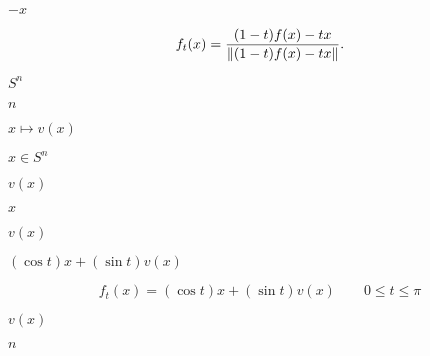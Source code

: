 \documentclass[10pt]{book}
\begin{document}
\begin{mdSnippets}
\begin{mdInlineSnippet}[d25c186e3f3096a9ff4a918f7b3141d4]
$-x$\end{mdInlineSnippet}%
\begin{mdDisplaySnippet}[734b60104e47487acc009a7e79621da6]%
\[%
f_t(x) = \frac{(1-t)f(x) - tx}{\norm{(1-t)f(x) - tx}}.
\]%
\end{mdDisplaySnippet}%
\begin{mdInlineSnippet}[f74115260830faf5178589e98c061a4e]%
$S^n$\end{mdInlineSnippet}%
\begin{mdInlineSnippet}[7b8b965ad4bca0e41ab51de7b31363a1]%
$n$\end{mdInlineSnippet}%
\begin{mdInlineSnippet}[70148f95c08937695dfa9ad2d002c2dc]%
$x \mapsto v(x)$\end{mdInlineSnippet}%
\begin{mdInlineSnippet}%
$x \in S^n$\end{mdInlineSnippet}%
\begin{mdInlineSnippet}[6668cae114cc8d4dc991ac6152f99da5]%
$v(x)$\end{mdInlineSnippet}%
\begin{mdInlineSnippet}[9dd4e461268c8034f5c8564e155c67a6]%
$x$\end{mdInlineSnippet}%
\begin{mdInlineSnippet}[6668cae114cc8d4dc991ac6152f99da5]%
$v(x)$\end{mdInlineSnippet}%
\begin{mdInlineSnippet}%
$(\cos t)x + (\sin t)v(x)$\end{mdInlineSnippet}%
\begin{mdDisplaySnippet}[d605d2e14b5f8473e37bc48542aa74cb]%
\[%
f_t(x) = (\cos t)x + (\sin t)v(x) \qquad 0 \le t \le \pi
\]%
\end{mdDisplaySnippet}%
\begin{mdInlineSnippet}[6668cae114cc8d4dc991ac6152f99da5]%
$v(x)$\end{mdInlineSnippet}%
\begin{mdInlineSnippet}[7b8b965ad4bca0e41ab51de7b31363a1]%
$n$\end{mdInlineSnippet}%

\end{mdSnippets}
\end{document}
